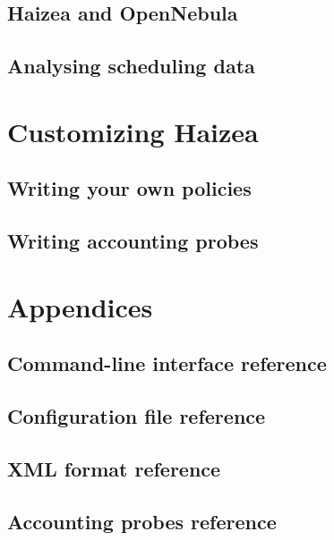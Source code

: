 \documentclass[11pt,oneside]{scrbook}
\begin{document}
\chapter{Haizea and OpenNebula}
\label{chap:opennebula}


\chapter{Analysing scheduling data}
\label{chap:analysing}



\part{Customizing Haizea}

\chapter{Writing your own policies}
\label{chap:policies}


\chapter{Writing accounting probes}
\label{chap:accounting}


%


\part{Appendices}
\appendix

\chapter{Command-line interface reference}
\label{app:cli}


\chapter{Configuration file reference}
\label{app:conffile}


\chapter{XML format reference}
\label{app:lwf}


\chapter{Accounting probes reference}
\label{app:probes}


%
\end{document}
